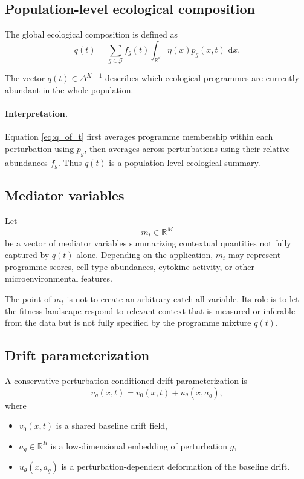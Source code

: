 \documentclass[11pt]{article}
\newcommand{\R}{\mathbb{R}}
\newcommand{\G}{\mathcal{G}}
\newcommand{\1}{\mathbf{1}}
\newcommand{\dd}{\,\mathrm{d}}
\theoremstyle{plain}
\begin{document}
\subsection{Population-level ecological composition}

The global ecological composition is defined as
\begin{equation}
q(t)=\sum_{g\in\G} f_g(t)\int_{\R^d} \eta(x)p_g(x,t)\,\dd x.
\label{eq:q_of_t}
\end{equation}

The vector $q(t)\in\Delta^{K-1}$ describes which ecological programmes are currently abundant in the whole population.

\paragraph{Interpretation.}
Equation \eqref{eq:q_of_t} first averages programme membership within each perturbation using $p_g$, then averages across perturbations using their relative abundances $f_g$. Thus $q(t)$ is a population-level ecological summary.

\subsection{Mediator variables}

Let
\begin{equation}
 m_t \in \R^M
 \label{eq:mediators}
\end{equation}
be a vector of mediator variables summarizing contextual quantities not fully captured by $q(t)$ alone. Depending on the application, $m_t$ may represent programme scores, cell-type abundances, cytokine activity, or other microenvironmental features.

The point of $m_t$ is not to create an arbitrary catch-all variable. Its role is to let the fitness landscape respond to relevant context that is measured or inferable from the data but is not fully specified by the programme mixture $q(t)$.

\subsection{Drift parameterization}

A conservative perturbation-conditioned drift parameterization is
\begin{equation}
 v_g(x,t)=v_0(x,t)+u_\theta(x,a_g),
 \label{eq:drift_param}
\end{equation}
where
\begin{itemize}
    \item $v_0(x,t)$ is a shared baseline drift field,
    \item $a_g\in\R^R$ is a low-dimensional embedding of perturbation $g$,
    \item $u_\theta(x,a_g)$ is a perturbation-dependent deformation of the baseline drift.
\end{itemize}
\end{document}
